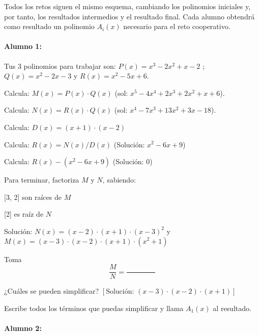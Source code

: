 

Todos los retos siguen el mismo esquema, cambiando los polinomios iniciales y, por tanto, los resultados intermedios y el resultado final.
%
Cada alumno obtendrá como resultado un polinomio $A_i(x)$ necesario para el reto cooperativo.

\paragraph{Alumno 1:\\}



Tus 3 polinomios para trabajar son: $P(x) =  x^3 - 2x^2 + x - 2 $ ; $Q(x) =  x^2 - 2x - 3 $ y $R(x) =  x^2 - 5x + 6 $.



Calcula: $M(x) = P(x)\cdot  Q(x)$ (sol: $ x^5 - 4x^4 + 2x^3 + 2x^2 + x + 6 $).

Calcula: $N(x) = R(x)\cdot  Q(x)$ (sol: $ x^4 - 7x^3 + 13x^2 + 3x - 18 $).

Calcula: $D(x) = ( x + 1 )\cdot  ( x - 2 )$

Calcula: $R(x) = N(x) / D(x)$ (Solución: $ x^2 - 6x + 9 $)

Calcula: $R(x) - ( x^2 - 6x + 9 )$ (Solución: $ 0 $)

Para terminar, factoriza $M$ y $N$, sabiendo:

     [3, 2]  son raíces de $M$

     [2]  es raíz de $N$

Solución: $N(x) =  (x - 2) \cdot  (x + 1) \cdot  (x - 3)^2 $ y $M(x) =  (x - 3) \cdot  (x - 2) \cdot  (x + 1) \cdot  (x^2 + 1) $

Toma \[\frac{M}{N} = \frac{\quad\quad\quad\quad}{\quad\quad\quad\quad}\]

¿Cuáles se pueden simplificar? $\left[\text{Solución: } (x - 3) \cdot  (x - 2) \cdot  (x + 1) \right]$

Escribe todos los términos que puedas simplificar y llama $A_1(x)$ al resultado.













\paragraph{Alumno 2:\\}



